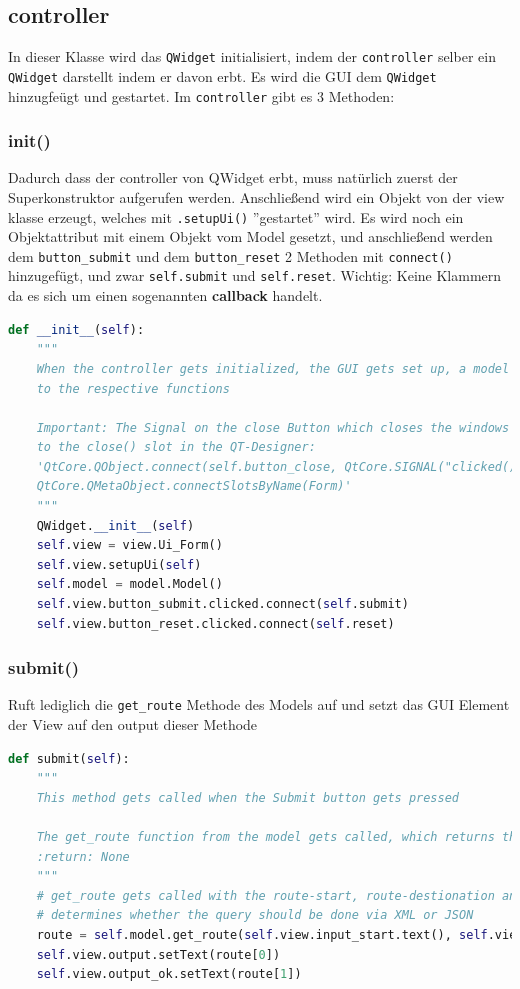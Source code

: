 \subsection{controller}
In dieser Klasse wird das \verb|QWidget| initialisiert, indem der \verb|controller| selber ein \verb|QWidget| darstellt indem er davon erbt. Es wird die GUI dem \verb|QWidget| hinzugfeügt und gestartet. Im \verb|controller| gibt es 3 Methoden:

\subsubsection{init()}
Dadurch dass der controller von QWidget erbt, muss natürlich zuerst der Superkonstruktor aufgerufen werden. Anschließend wird ein Objekt von der view klasse erzeugt, welches mit \verb|.setupUi()| ''gestartet'' wird.
Es wird noch ein Objektattribut mit einem Objekt vom Model gesetzt, und anschließend werden dem \verb|button_submit| und dem \verb|button_reset| 2 Methoden mit \verb|connect()| hinzugefügt, und zwar \verb|self.submit| und \verb|self.reset|. Wichtig: Keine Klammern da es sich um einen sogenannten \textbf{callback} handelt.

\begin{lstlisting}[language=python]
def __init__(self):
	"""
	When the controller gets initialized, the GUI gets set up, a model member is set and the buttons are connected
	to the respective functions
	
	Important: The Signal on the close Button which closes the windows already got connected
	to the close() slot in the QT-Designer:
	'QtCore.QObject.connect(self.button_close, QtCore.SIGNAL("clicked()"), Form.close)
	QtCore.QMetaObject.connectSlotsByName(Form)'
	"""
	QWidget.__init__(self)
	self.view = view.Ui_Form()
	self.view.setupUi(self)
	self.model = model.Model()
	self.view.button_submit.clicked.connect(self.submit)
	self.view.button_reset.clicked.connect(self.reset)
\end{lstlisting}

\subsubsection{submit()}
Ruft lediglich die \verb|get_route| Methode des Models auf und setzt das GUI Element der View auf den output dieser Methode

\begin{lstlisting}[language=python]
def submit(self):
	"""
	This method gets called when the Submit button gets pressed
	
	The get_route function from the model gets called, which returns the route and a status
	:return: None
	"""
	# get_route gets called with the route-start, route-destionation and a paremeter which
	# determines whether the query should be done via XML or JSON
	route = self.model.get_route(self.view.input_start.text(), self.view.input_ziel.text(), self.view.mode.isChecked())
	self.view.output.setText(route[0])
	self.view.output_ok.setText(route[1])
\end{lstlisting}


